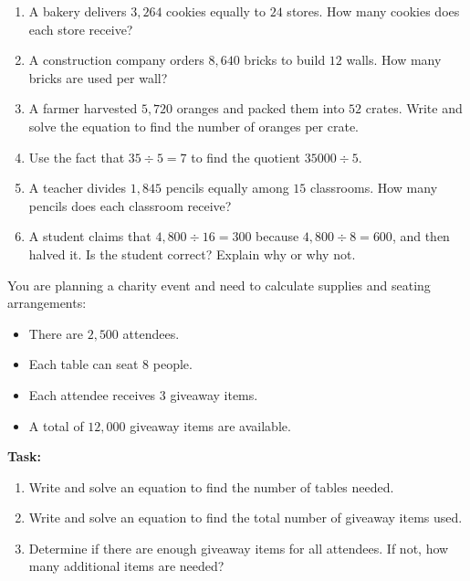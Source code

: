 \documentclass[12pt]{article}
\begin{document}
\begin{tcolorbox}[colframe=black!60, colback=white, 
coltitle=black, colbacktitle=black!15, fonttitle=\bfseries\Large, 
title=Problems, halign title=center, left=10pt, right=10pt, top=10pt, bottom=100pt]
\begin{enumerate}[start=9, itemsep=5em]
    \item A bakery delivers \( 3,264 \) cookies equally to \( 24 \) stores. How many cookies does each store receive?
    \item A construction company orders \( 8,640 \) bricks to build \( 12 \) walls. How many bricks are used per wall?
    \item A farmer harvested \( 5,720 \) oranges and packed them into \( 52 \) crates. Write and solve the equation to find the number of oranges per crate.
     \item Use the fact that \( 35 \div 5 = 7 \) to find the quotient \(35000 \div 5.\) 
    \item A teacher divides \( 1,845 \) pencils equally among \( 15 \) classrooms. How many pencils does each classroom receive?
   \item A student claims that \( 4,800 \div 16 = 300 \) because \( 4,800 \div 8 = 600 \), and then halved it. Is the student correct? Explain why or why not.
\end{enumerate}
\end{tcolorbox}

\vspace{1em}

\begin{tcolorbox}[colframe=black!60, colback=white, 
coltitle=black, colbacktitle=black!15, fonttitle=\bfseries\Large, 
title=Performance Task: Planning a Charity Event, halign title=center, left=10pt, right=10pt, top=10pt, bottom=100pt]
You are planning a charity event and need to calculate supplies and seating arrangements:
\begin{itemize}
    \item There are \( 2,500 \) attendees.
    \item Each table can seat \( 8 \) people.
    \item Each attendee receives \( 3 \) giveaway items.
    \item A total of \( 12,000 \) giveaway items are available.
\end{itemize}
\textbf{Task:}
\begin{enumerate}[itemsep=4em]
    \item Write and solve an equation to find the number of tables needed.
    \item Write and solve an equation to find the total number of giveaway items used.
    \item Determine if there are enough giveaway items for all attendees. If not, how many additional items are needed?
\end{enumerate}
\end{tcolorbox}
\end{document}

